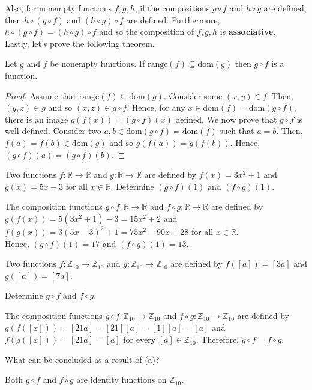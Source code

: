 \documentclass[12pt]{article}
\newcommand{\Z}{\mathbb{Z}}
\newcommand{\R}{\mathbb{R}}
\newcommand{\Dom}[1]{\mathrm{dom}(#1)}
\newcommand{\Range}[1]{\mathrm{range}(#1)}
\newenvironment{theorem}[2][Theorem]{\begin{trivlist} \item[\hskip \labelsep {\bfseries #1}\hskip \labelsep {\bfseries #2.}]}{\end{trivlist}}
\newenvironment{problem}[2][Problem]{\begin{trivlist} \item[\hskip \labelsep {\bfseries #1}\hskip \labelsep {\bfseries #2.}]}{\end{trivlist}}
\newenvironment{solution}[1][Solution]{\begin{trivlist} \item[\hskip \labelsep {\bfseries #1}]}{\end{trivlist}}
\begin{document}
    Also, for nonempty functions $f,g,h$, if the compositions $g\circ f$ and $h\circ g$ are defined, then $h\circ (g \circ f)$ and $(h\circ g)\circ f$ are defined. Furthermore, $h\circ(g\circ f) = (h\circ g)\circ f$ and so the composition of $f,g,h$ is \textbf{associative}. \\
    Lastly, let's prove the following theorem.
    \begin{theorem}{9.5.1}
      Let $g$ and $f$ be nonempty functions. If $\Range{f}\subseteq \Dom{g}$ then  $g\circ f$ is a function.
    \begin{proof}
      Assume that $\Range{f}\subseteq \Dom{g}$. Consider some $(x,y)\in f$. Then, $(y,z)\in g$ and so $(x,z)\in g\circ f$. Hence, for any $x\in \Dom{f}=\Dom{g\circ f}$, there is an image $g(f(x)) = (g\circ f)(x)$ defined. We now prove that $g\circ f$ is well-defined. Consider two $a,b\in \Dom{g\circ f} = \Dom{f}$ such that $a=b$. Then, $f(a)=f(b)\in \Dom{g}$ and so $g(f(a))=g(f(b))$. Hence, $(g\circ f)(a)=(g\circ f)(b)$.
    \end{proof}
    \end{theorem}
    \begin{problem}{38}
      Two functions $f:\R \to \R$ and $g:\R \to \R$ are defined by $f(x) = 3x^{2}+1$ and $g(x) = 5x-3$ for all $x\in \R$. Determine $(g\circ f)(1)$ and $(f\circ g)(1)$.
    \begin{solution}
      The composition functions $g\circ f:\R \to \R$ and $f\circ g: \R \to \R$ are defined by $g(f(x)) = 5\left( 3x^{2}+1 \right)-3 = 15x^{2}+2$ and $f(g(x)) = 3\left( 5x-3\right)^{2}+1 = 75x^{2}-90x+28$ for all $x\in \R$.\\
      Hence, $(g\circ f)(1) =17$ and $(f\circ g)(1) = 13$.
    \end{solution}
    \end{problem}
    \begin{problem}{39}
      Two functions $f:\Z_{10} \to \Z_{10}$ and $g:\Z_{10} \to \Z_{10}$ are defined by $f([a])=[3a]$ and $g([a])=[7a]$.
    \begin{enumerate}
      \item Determine $g\circ f$ and $f\circ g$.
    \begin{solution}
    The composition functions $g\circ f:\Z_{10}\to \Z_{10}$ and $f\circ g: \Z_{10} \to \Z_{10}$ are defined by $g(f([x])) = [21a]=[21][a]=[1][a]=[a]$ and $f(g([x])) = [21a]=[a]$ for every $[a]\in \Z_{10}$. Therefore, $g\circ f=f\circ g$.
    \end{solution}
      \item What can be concluded as a result of (a)?
    \begin{solution}
      Both $g\circ f$ and $f\circ g$ are identity functions on $\Z_{10}$.
    \end{solution}
    \end{enumerate}
    \end{problem}
\end{document}
